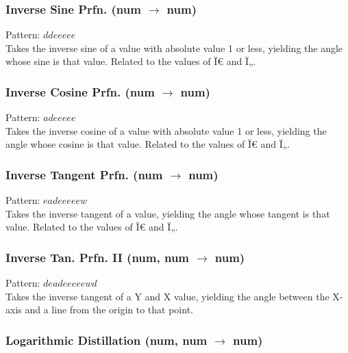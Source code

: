 \documentclass[12pt]{article}
\begin{document}
  \label{sec: patterns/advanced_math@hexcasting:arcsin}
\subsubsection*{Inverse Sine Prfn. (num $\rightarrow$ num)}

    Pattern: $ddeeeee$\\
      Takes the inverse sine of a value with absolute value 1 or less, yielding the angle whose sine is that value. Related to the values of Ï€ and Ï„.\\


  \label{sec: patterns/advanced_math@hexcasting:arccos}
\subsubsection*{Inverse Cosine Prfn. (num $\rightarrow$ num)}

    Pattern: $adeeeee$\\
      Takes the inverse cosine of a value with absolute value 1 or less, yielding the angle whose cosine is that value. Related to the values of Ï€ and Ï„.\\


  \label{sec: patterns/advanced_math@hexcasting:arctan}
\subsubsection*{Inverse Tangent Prfn. (num $\rightarrow$ num)}

    Pattern: $eadeeeeew$\\
      Takes the inverse tangent of a value, yielding the angle whose tangent is that value. Related to the values of Ï€ and Ï„.\\


  \label{sec: patterns/advanced_math@hexcasting:arctan2}
\subsubsection*{Inverse Tan. Prfn. II (num, num $\rightarrow$ num)}

    Pattern: $deadeeeeewd$\\
      Takes the inverse tangent of a Y and X value, yielding the angle between the X-axis and a line from the origin to that point.\\


  \label{sec: patterns/advanced_math@hexcasting:logarithm}
\subsubsection*{Logarithmic Distillation (num, num $\rightarrow$ num)}
\end{document}
